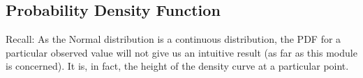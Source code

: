 \documentclass[]{report}
\begin{document}
	
	
	
	
	\subsection{Probability Density Function}
	Recall: As the Normal distribution is a continuous distribution, the PDF for a particular observed value will not give us an intuitive
	result (as far as this module is concerned). It is, in fact, the height of the density curve at a particular point.
	
\end{document}
